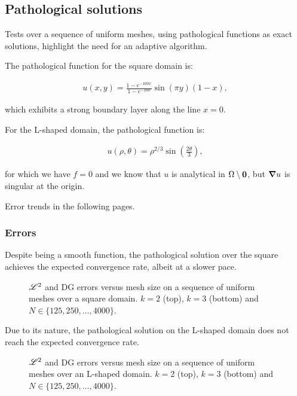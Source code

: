 \newpage
\subsection{Pathological solutions}

Tests over a sequence of uniform meshes, using pathological functions as exact solutions, highlight the need for an adaptive algorithm.

\cite{Antonietti2013} The pathological function for the square domain is:

\begin{gather} \label{pathological_square}
    u(x, y) = \frac{1 - e^{-100x}}{1 - e^{-100}} \sin(\pi y) (1 - x),
\end{gather}

which exhibits a strong boundary layer along the line $x = 0$.

For the L-shaped domain, the pathological function is:

\begin{gather} \label{pathological_lshape}
    u(\rho, \theta) = \rho^{2 / 3} \sin\left(\frac{2 \theta}{3}\right),
\end{gather}

for which we have $f = 0$ and we know that $u$ is analytical in $\Omega \setminus \bm{0}$, but $\bm{\nabla}{u}$ is singular at the origin.

Error trends in the following pages.

\newpage
\subsubsection{Errors}

Despite being a smooth function, the pathological solution over the square achieves the expected convergence rate, albeit at a slower pace.

\begin{figure}[!ht]
    
    
    \caption{$\mathscr{L}^2$ and DG errors versus mesh size on a sequence of uniform meshes over a square domain. $k = 2$ (top), $k = 3$ (bottom) and $N \in \{125, 250, \dots, 4000\}$.}
\end{figure}

\newpage

Due to its nature, the pathological solution on the L-shaped domain does not reach the expected convergence rate.

\begin{figure}[!ht]
    
    
    \caption{$\mathscr{L}^2$ and DG errors versus mesh size on a sequence of uniform meshes over an L-shaped domain. $k = 2$ (top), $k = 3$ (bottom) and $N \in \{125, 250, \dots, 4000\}$.}
\end{figure}